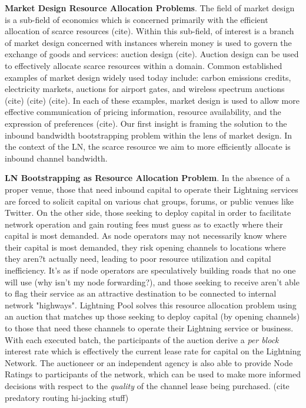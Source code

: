 \documentclass[10pt,a4paper]{article}
\theoremstyle{definition}
\begin{document}
\textbf{Market Design Resource Allocation Problems}. The field of market design
is a sub-field of economics which is concerned primarily with the efficient
allocation of scarce resources (cite). Within this sub-field, of interest is a
branch of market design concerned with instances wherein money is used to
govern the exchange of goods and services: auction design (cite). Auction
design can be used to effectively allocate scarce resources within a domain.
Common established examples of market design widely used today include: carbon
emissions credits, electricity markets, auctions for airport gates, and
wireless spectrum auctions (cite) (cite) (cite). In each of these examples,
market design is used to allow more effective communication of pricing
information, resource availability, and the expression of preferences (cite).
Our first insight is framing the solution to the inbound bandwidth
bootstrapping problem within the lens of market design. In the context of the
LN, the scarce resource we aim to more efficiently allocate is inbound channel
bandwidth. 

\textbf{LN Bootstrapping as Resource Allocation Problem}. In the absence of a
proper venue, those that need inbound capital to operate their Lightning
services are forced to solicit capital on various chat groups, forums, or public venues like
Twitter. On the other side, those seeking to deploy capital in order to
facilitate network operation and gain routing fees must guess as to exactly
where their capital is most demanded. As node operators may not necessarily
know where their capital is most demanded, they risk opening channels to locations where
they aren?t actually need, leading to poor resource utilization and capital
inefficiency. It's as if node operators are speculatively building roads
that no one will use (why isn't my node forwarding?), and those seeking to
receive aren't able to flag their service as an attractive destination to be
connected to internal network "highways". Lightning Pool solves this resource
allocation problem using an auction that matches up those seeking to
deploy capital (by opening channels) to those that need these channels to
operate their Lightning service or business. With each executed batch, the
participants of the auction derive a \emph{per block} interest rate which is
effectively the current lease rate for capital on the Lightning Network. The
auctioneer or an independent agency is also able to provide Node Ratings to
participants of the network, which can be used to make more informed decisions
with respect to the \emph{quality} of the channel lease being purchased. (cite
predatory routing hi-jacking stuff)
\end{document}
